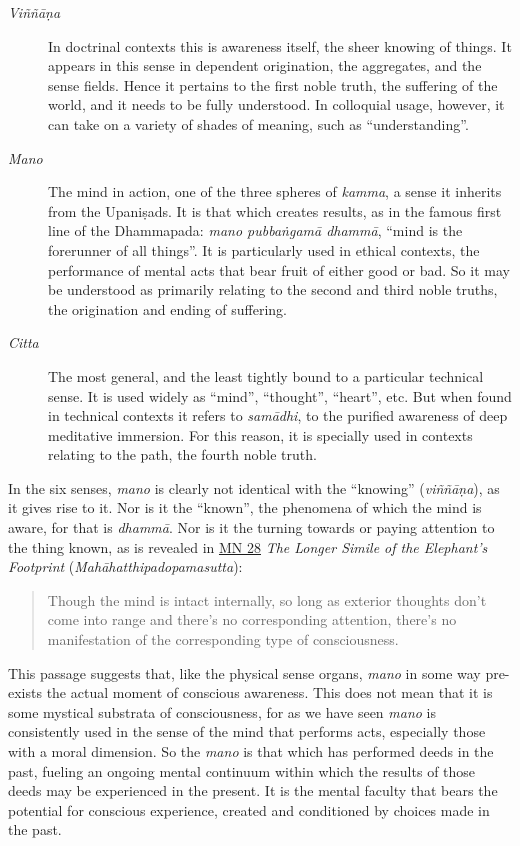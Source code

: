 \documentclass[12pt,openany]{book}%
\begin{document}
\begin{description}%
\item[\textit{\textsanskrit{Viññāṇa}}] In doctrinal contexts this is awareness itself, the sheer knowing of things. It appears in this sense in dependent origination, the aggregates, and the sense fields. Hence it pertains to the first noble truth, the suffering of the world, and it needs to be fully understood. In colloquial usage, however, it can take on a variety of shades of meaning, such as “understanding”.%
\item[\textit{Mano}] The mind in action, one of the three spheres of \textit{kamma}, a sense it inherits from the \textsanskrit{Upaniṣads}. It is that which creates results, as in the famous first line of the Dhammapada: \textit{mano \textsanskrit{pubbaṅgamā} \textsanskrit{dhammā}}, “mind is the forerunner of all things”. It is particularly used in ethical contexts, the performance of mental acts that bear fruit of either good or bad. So it may be understood as primarily relating to the second and third noble truths, the origination and ending of suffering.%
\item[\textit{Citta}] The most general, and the least tightly bound to a particular technical sense. It is used widely as “mind”, “thought”, “heart”, etc. But when found in technical contexts it refers to \textit{\textsanskrit{samādhi}}, to the purified awareness of deep meditative immersion. For this reason, it is specially used in contexts relating to the path, the fourth noble truth.%
\end{description}

In the six senses, \textit{mano} is clearly not identical with the “knowing” (\textit{\textsanskrit{viññāṇa}}), as it gives rise to it. Nor is it the “known”, the phenomena of which the mind is aware, for that is \textit{\textsanskrit{dhammā}}. Nor is it the turning towards or paying attention to the thing known, as is revealed in \href{https://suttacentral.net/mn28}{MN 28} \textit{The Longer Simile of the Elephant’s Footprint} (\textit{\textsanskrit{Mahāhatthipadopamasutta}}):

\begin{quotation}%
Though the mind is intact internally, so long as exterior thoughts don’t come into range and there’s no corresponding attention, there’s no manifestation of the corresponding type of consciousness.

%
\end{quotation}

This passage suggests that, like the physical sense organs, \textit{mano} in some way pre-exists the actual moment of conscious awareness. This does not mean that it is some mystical substrata of consciousness, for as we have seen \textit{mano} is consistently used in the sense of the mind that performs acts, especially those with a moral dimension. So the \textit{mano} is that which has performed deeds in the past, fueling an ongoing mental continuum within which the results of those deeds may be experienced in the present. It is the mental faculty that bears the potential for conscious experience, created and conditioned by choices made in the past.
\end{document}
